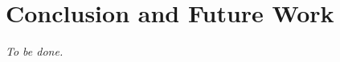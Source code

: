\chapter{Conclusion and Future Work} \label{chapter:conclusion_and_future_work}

\textit{To be done.}

